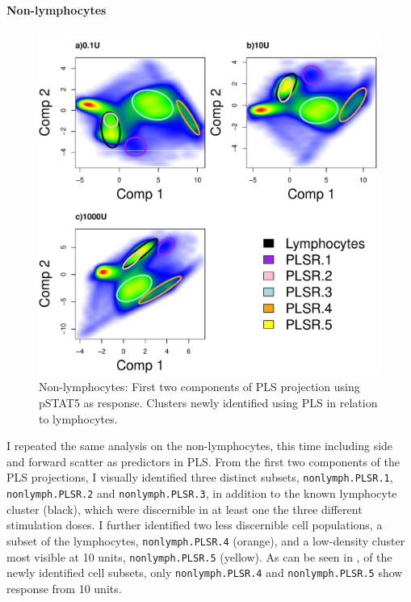 \paragraph{Non-lymphocytes} 

\begin{figure}[!h]
\centering
\includegraphics[scale=.7]{figures/plsr-nonlymphocytes}
{ Non-lymphocytes: First two components of \gls{PLS} projection using pSTAT5 as response.}
{
Clusters newly identified using \gls{PLS} in relation to lymphocytes.
} 
\end{figure}

I repeated the same analysis on the non-lymphocytes, this time including side and forward scatter as predictors in \gls{PLS}.
From the first two components of the \gls{PLS} projections, I visually identified three distinct subsets, \texttt{nonlymph.PLSR.1}, \texttt{nonlymph.PLSR.2}  and \texttt{nonlymph.PLSR.3}, in addition to the known lymphocyte cluster (black), which were discernible in at least one the three different stimulation doses.
I further identified two less discernible cell populations, a subset of the lymphocytes, \texttt{nonlymph.PLSR.4} (orange), and a low-density cluster most visible at 10 units, \texttt{nonlymph.PLSR.5} (yellow).
As can be seen in , of the newly identified cell subsets, only \texttt{nonlymph.PLSR.4} and \texttt{nonlymph.PLSR.5} show response from 10 units.

